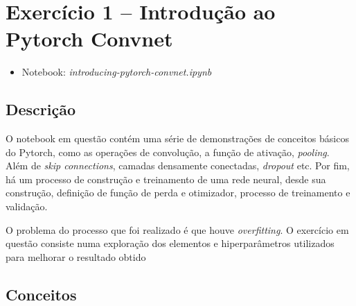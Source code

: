 \section{Exercício 1 -- Introdução ao Pytorch Convnet}

\begin{itemize}
	\item Notebook: \textit{introducing-pytorch-convnet.ipynb}
\end{itemize}

\subsection{Descrição}

O notebook em questão contém uma série de demonstrações de conceitos básicos do Pytorch, como as operações de convolução, a função de ativação, \textit{pooling}. Além de \textit{skip connections}, camadas densamente conectadas, \textit{dropout} etc. Por fim, há um processo de construção e treinamento de uma rede neural, desde sua construção, definição de função de perda e otimizador, processo de treinamento e validação.

O problema do processo que foi realizado é que houve \textit{overfitting}. O exercício em questão consiste numa exploração dos elementos e hiperparâmetros utilizados para melhorar o resultado obtido

\subsection{Conceitos}